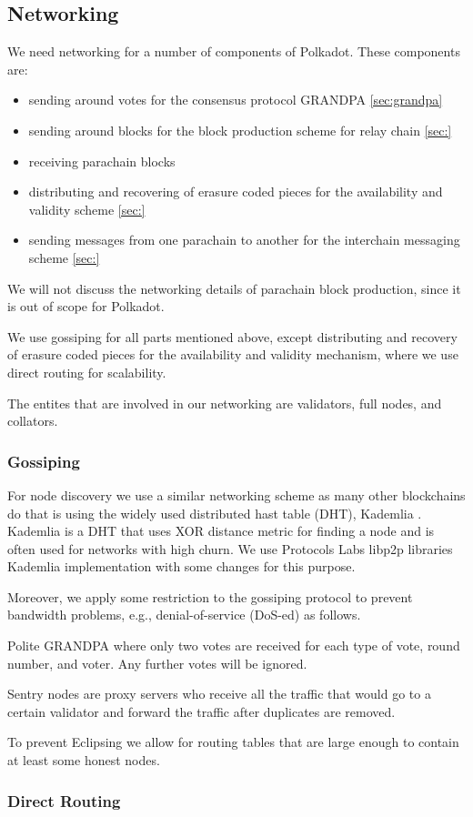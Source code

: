 \subsection{Networking}\label{sec:networking}

We need networking for a number of components of Polkadot.
These components are:
\begin{itemize}
\item sending around votes for the consensus protocol GRANDPA \ref{sec:grandpa}
\item sending around blocks for the block production scheme for relay chain \ref{sec:}
\item receiving parachain blocks
\item distributing and recovering of erasure coded pieces for the availability and validity scheme \ref{sec:}
\item sending messages from one parachain to another for the interchain messaging scheme \ref{sec:}
\end{itemize}

We will not discuss the networking details of parachain block production, since it is out of scope for Polkadot.

We use gossiping for all parts mentioned above, except distributing and recovery of erasure coded pieces for the availability and validity mechanism, where we use direct routing for scalability.

The entites that are involved in our networking are validators, full nodes, and collators.

\subsubsection{Gossiping}
For node discovery we use a similar networking scheme as many other blockchains do that is using the widely used distributed hast table (DHT), Kademlia \cite{}.
Kademlia is a DHT that uses XOR distance metric for finding a node and is often used for networks with high churn.
We use Protocols Labs libp2p libraries \cite{} Kademlia implementation with some changes for this purpose.

Moreover, we apply some restriction to the gossiping protocol to prevent bandwidth problems, e.g., denial-of-service (DoS-ed) as follows.

Polite GRANDPA where only two votes are received for each type of vote, round number, and voter. Any further votes will be ignored.

Sentry nodes are proxy servers who receive all the traffic that would go to a certain validator and forward the traffic after duplicates are removed.

To prevent Eclipsing \cite{} we allow for routing tables that are large enough to contain at least some honest nodes.

\subsubsection{Direct Routing}
